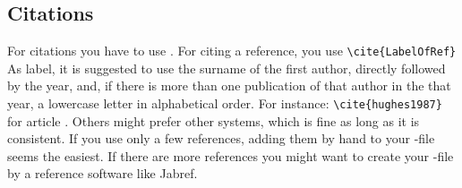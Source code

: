 \documentclass[../main.tex]{subfiles}
\begin{document}
\subsection{Citations}
\label{sec:cite}

For citations you have to use \BibTeX. For citing a reference, you use
\verb!\cite{LabelOfRef}! As label, it is suggested to use the surname of the
first author, directly followed by the year, and, if there is more than one
publication of that author in the that year, a lowercase letter in
alphabetical order. For instance: \verb!\cite{hughes1987}! for article
\cite{hughes1987}. Others might prefer other systems, which is fine as long
as it is consistent. If you use only a few references, adding them by hand to
your \BibTeX-file seems the easiest. If there are more references you
might want to create your \BibTeX-file by a reference software like Jabref.
\end{document}
